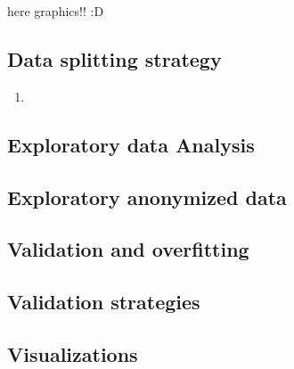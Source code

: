 \documentclass[12pt]{book}
\begin{document}
        here graphics!! :D 

    \subsection{Data splitting strategy}
        \begin{enumerate}
            \item                 
        \end{enumerate}
    \subsection{Exploratory data Analysis}
    \subsection{Exploratory anonymized data}
    \subsection{Validation and overfitting}
    \subsection{Validation strategies}
    \subsection{Visualizations}






        


\end{document}
